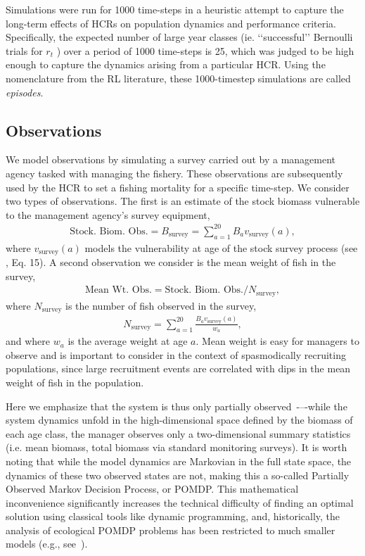 \documentclass[floatfix,nofootinbib,longbibliography,notitlepage]{revtex4-2}
\def\bsurv{B_{\text{survey}}}
\def\vsurv{v_{\text{survey}}}
\def\nsurv{N_{\text{survey}}}
\begin{document}
Simulations were run for 1000 time-steps in a heuristic attempt to capture the long-term effects of HCRs on population dynamics and performance criteria. 
Specifically, the expected number of large year classes (ie. ‘‘successful’’ Bernoulli trials for $r_t$ ) over a period of 1000 time-steps is 25, which was judged to be high enough to capture the dynamics arising from a particular HCR. 
Using the nomenclature from the RL literature, these 1000-timestep simulations are called \emph{episodes}.

\subsection{Observations}

We model observations by simulating a survey carried out by a management agency tasked with managing the fishery. 
These observations are subsequently used by the HCR to set a fishing mortality for a specific  time-step. 
We consider two types of observations. 
The first is an estimate of the stock biomass vulnerable to the management agency’s survey equipment,
\begin{align}
    \text{Stock. Biom. Obs.} = \bsurv = \sum_{a=1}^{20} B_a \vsurv(a),
\end{align}
where $\vsurv(a)$ models the vulnerability at age of the stock survey process (see \cite{cahill2022}, Eq. 15). 
A second observation we consider is the mean weight of fish in the survey,
\begin{align}
    \text{Mean Wt. Obs.} = \text{Stock. Biom. Obs.} / \nsurv,
\end{align}
where $\nsurv$ is the number of fish observed in the survey,
\begin{align}
    \nsurv = \sum_{a=1}^{20} \frac{B_a \vsurv(a)}{w_a},
\end{align}
and where $w_a$ is the average weight at age $a$.
Mean weight is easy for managers to observe and is important to consider in the context of spasmodically recruiting populations, since large recruitment events are correlated with dips in the mean weight of fish in the population.

Here we emphasize that the system is thus only partially observed~\cite{memarzadeh2019}-–-while the system dynamics unfold in the high-dimensional space defined by the biomass of each age class, the manager observes only a two-dimensional summary statistics (i.e. mean biomass, total biomass via standard monitoring surveys). 
It is worth noting that while the model dynamics are Markovian in the full state space, the dynamics of these two observed states are not, making this a so-called Partially Observed Markov Decision Process, or POMDP.  
This mathematical inconvenience significantly increases the technical difficulty  of finding an optimal solution using classical tools like dynamic programming, and, historically, the analysis of ecological POMDP problems has been restricted to much smaller models  (e.g., see~\cite{williams2022}).
\end{document}
